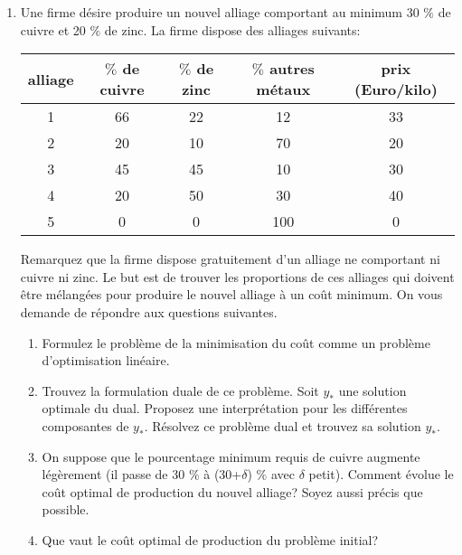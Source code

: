 \begin{enumerate}
    \begin{solution}
      \nosolution
    \end{solution}

  \item  Une firme d\'esire produire un nouvel alliage comportant au minimum
    30 $\%$ de cuivre et 20 $\%$ de zinc. La firme dispose des alliages suivants:

    \begin{tabular}{|c|c|c|c|c|}
      \hline
      alliage &  $\%$ de cuivre & $\%$ de zinc & $\%$ autres m\'etaux & prix (Euro/kilo) \\
      \hline
      1 & 66 & 22 & 12 & 33 \\
      \hline
      2 & 20 & 10 & 70 & 20 \\
      \hline
      3 & 45 & 45 & 10 & 30 \\
      \hline
      4 & 20 & 50  & 30 & 40\\
      \hline
      5 & 0 & 0 & 100 & 0 \\
      \hline
    \end{tabular}


    Remarquez que la firme dispose gratuitement d'un alliage ne comportant ni cuivre ni zinc.
    Le but est de trouver les proportions de ces alliages qui doivent
    \^etre m\'elang\'ees  pour produire le nouvel alliage \`a un co\^ut minimum. On vous demande de r\'epondre aux questions suivantes.

    \begin{enumerate}
      \item  Formulez le probl\`eme de la minimisation du co\^ut comme un probl\`eme
        d'optimisation lin\'eaire.

      \item Trouvez la formulation duale de ce probl\`eme. Soit $y_*$ une solution
        optimale du dual. Proposez une interpr\'etation pour les
        diff\'erentes composantes de
        $y_*$. R\'esolvez ce probl\`eme dual et trouvez sa solution $y_*$.
      \item   On suppose que le pourcentage minimum requis de cuivre augmente l\'eg\`erement
        (il passe de 30 $\%$ \`a (30+$\delta$) $\%$ avec $\delta$ petit).
        Comment \'evolue le co\^ut optimal de production du nouvel alliage?
        Soyez aussi pr\'ecis que possible.

      \item Que vaut le co\^ut optimal de production du probl\`eme initial?
    \end{enumerate}





\end{enumerate}
